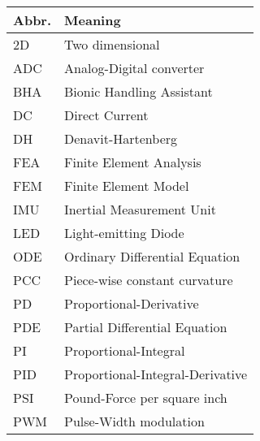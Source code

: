 \begin{spacing}{0.9}
\begin{multicols}{2}
\begin{table}[H]
\centering
    \begin{tabular}{p{1.5cm} p{5cm}} \hline
    \textbf{Abbr.}    &   \textbf{Meaning }\\ \hline
    2D       & Two dimensional \\
    ADC     &  Analog-Digital converter\\
    BHA    &  Bionic Handling Assistant\\
    DC    &  Direct Current\\
    DH    &  Denavit-Hartenberg\\
    FEA     &  Finite Element Analysis \\
    FEM     &  Finite Element Model \\
    IMU    & Inertial Measurement Unit \\
    LED   & Light-emitting Diode \\
    ODE   & Ordinary Differential Equation \\
    PCC   & Piece-wise constant curvature \\
    PD    & Proportional-Derivative \\
    PDE    & Partial Differential Equation \\
    PI   & Proportional-Integral \\
    PID   & Proportional-Integral-Derivative\\
    PSI    & Pound-Force per square inch\\
    PWM    & Pulse-Width modulation\\  \hline
    \end{tabular}
\end{table}





\end{multicols}
\end{spacing}
